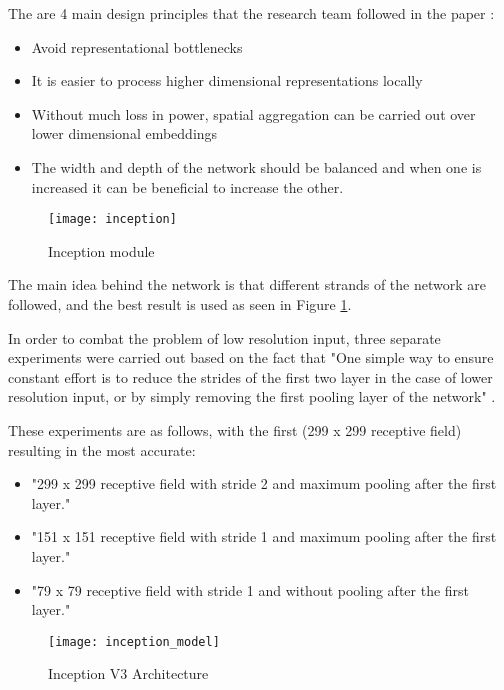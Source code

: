The are 4 main design principles that the research team followed in the paper \parencite{rethinkingInception}:
\begin{itemize}
    \item{Avoid representational bottlenecks}
    \item{It is easier to process higher dimensional representations locally}
    \item{Without much loss in power, spatial aggregation can be carried out over lower dimensional embeddings}
    \item{The width and depth of the network should be balanced and when one is increased it can be beneficial to increase the other.}
\end{itemize}

\begin{figure}
    \centering
     \texttt{[image: inception]}
     \caption{Inception module \parencite{rethinkingInception}}
     \label{fig:inception}
\end{figure}

The main idea behind the network is that different strands of the network are followed, and the best result is used as seen in Figure \ref{fig:inception}.

In order to combat the problem of low resolution input, three separate experiments were carried out based on the fact that "One simple way to ensure constant effort is to reduce the strides of the first two layer in the case of lower resolution input, or by simply removing the first pooling layer of the network" \parencite{rethinkingInception}.

These experiments are as follows, with the first (299 x 299 receptive field) resulting in the most accurate:
\begin{itemize}
    \item{"299 x 299 receptive field with stride 2 and maximum pooling after the first layer." \parencite{rethinkingInception}}
    \item{"151 x 151 receptive field with stride 1 and maximum pooling after the first layer." \parencite{rethinkingInception}}
    \item{"79 x 79 receptive field with stride 1 and without pooling after the first layer." \parencite{rethinkingInception}}
\end{itemize}

\begin{figure}
    \centering
     \texttt{[image: inception\_model]}
     \caption{Inception V3 Architecture \parencite{rethinkingInception}}
     \label{fig:inception_model}
\end{figure}

